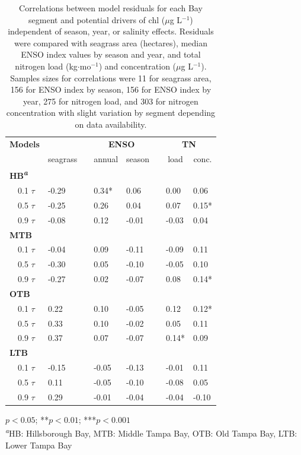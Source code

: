 \documentclass{svjour3}\usepackage[]{graphicx}\usepackage[]{color}
\newcommand{\mugl}{$\mu$g L$^{-1}$}
\begin{document}
\begin{table}[!tbp]
\caption{Correlations between model residuals for each Bay segment and potential drivers of \ac{chl} (\mugl) independent of season, year, or salinity effects. Residuals were compared with seagrass area (hectares), median ENSO index values by season and year, and total nitrogen load (kg$\cdot$mo$^{-1}$) and concentration (\mugl).  Samples sizes for correlations were 11 for seagrass area, 156 for ENSO index by season, 156 for ENSO index by year, 275 for nitrogen load, and 303 for nitrogen concentration with slight variation by segment depending on data availability.\label{tab:cormat}} 
\begin{center}
\begin{tabular}{llcllcll}
\hline\hline
\multicolumn{1}{l}{\bfseries Models}&\multicolumn{1}{c}{\bfseries }&\multicolumn{1}{c}{\bfseries }&\multicolumn{2}{c}{\bfseries ENSO}&\multicolumn{1}{c}{\bfseries }&\multicolumn{2}{c}{\bfseries TN}\tabularnewline
\cline{4-5} \cline{7-8}
\multicolumn{1}{l}{}&\multicolumn{1}{c}{seagrass}&\multicolumn{1}{c}{}&\multicolumn{1}{c}{annual}&\multicolumn{1}{c}{season}&\multicolumn{1}{c}{}&\multicolumn{1}{c}{load}&\multicolumn{1}{c}{conc.}\tabularnewline
\hline
{\bfseries HB\textsuperscript{\textit{a}}}&&&&&&&\tabularnewline
~~0.1 $\tau$&-0.29 &&0.34*&0.06 &&0.00 &0.06 \tabularnewline
~~0.5 $\tau$&-0.25 &&0.26 &0.04 &&0.07 &0.15*\tabularnewline
~~0.9 $\tau$&-0.08 &&0.12 &-0.01 &&-0.03 &0.04 \tabularnewline
\hline
{\bfseries MTB}&&&&&&&\tabularnewline
~~0.1 $\tau$&-0.04 &&0.09 &-0.11 &&-0.09 &0.11 \tabularnewline
~~0.5 $\tau$&-0.30 &&0.05 &-0.10 &&-0.05 &0.10 \tabularnewline
~~0.9 $\tau$&-0.27 &&0.02 &-0.07 &&0.08 &0.14*\tabularnewline
\hline
{\bfseries OTB}&&&&&&&\tabularnewline
~~0.1 $\tau$&0.22 &&0.10 &-0.05 &&0.12 &0.12*\tabularnewline
~~0.5 $\tau$&0.33 &&0.10 &-0.02 &&0.05 &0.11 \tabularnewline
~~0.9 $\tau$&0.37 &&0.07 &-0.07 &&0.14*&0.09 \tabularnewline
\hline
{\bfseries LTB}&&&&&&&\tabularnewline
~~0.1 $\tau$&-0.15 &&-0.05 &-0.13 &&-0.01 &0.11 \tabularnewline
~~0.5 $\tau$&0.11 &&-0.05 &-0.10 &&-0.08 &0.05 \tabularnewline
~~0.9 $\tau$&0.29 &&-0.01 &-0.04 &&-0.04 &-0.10 \tabularnewline
\hline
\end{tabular}\end{center}

\footnotesize *$p<0.05$; **$p<0.01$; ***$p<0.001$\\\textsuperscript{\textit{a}}HB: Hillsborough Bay, MTB: Middle Tampa Bay, OTB: Old Tampa Bay, LTB: Lower Tampa Bay\end{table}
\end{document}
